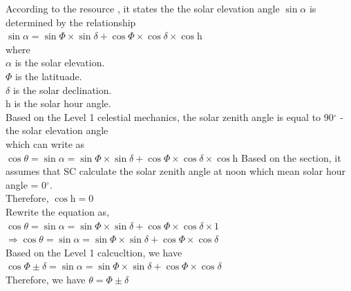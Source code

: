 \documentclass[12pt]{article}
\begin{document}
	According to the resource \cite{Harold1968}, it states the the solar elevation angle $\sin{\alpha}$ is
determined by the relationship\\
					$\sin{\alpha} = \sin{\Phi} \times \sin{\delta} + \cos{\Phi} \times \cos{\delta} \times \cos{\text{h}}$\\
		where \\
		  $\alpha$ is the solar elevation.\\
		  $\Phi$ is the latituade.\\
		  $\delta$ is the solar declination.\\
		  $\text{h}$ is the solar hour angle.\\
Based on the Level 1 celestial mechanics, the solar zenith angle 
is equal to 90$^\circ$ - the solar elevation angle\\
			which can write as\\
$\cos{\theta} = \sin{\alpha} = \sin{\Phi} \times \sin{\delta} + \cos{\Phi} \times \cos{\delta} \times \cos{\text{h}}$
			Based on the  section, it assumes that SC calculate the solar zenith 
angle at noon which mean solar hour angle = 0$^\circ$.\\
			Therefore, $\cos{\text{h}} = 0$\\
				Rewrite the equation as,\\
$\cos{\theta} = \sin{\alpha} = \sin{\Phi} \times \sin{\delta} + \cos{\Phi} \times \cos{\delta} \times 1$\\
$\Rightarrow  \cos{\theta} = \sin{\alpha} = \sin{\Phi} \times \sin{\delta} + \cos{\Phi} \times \cos{\delta}$\\
			Based on the Level 1 calcucltion, we have\\
$\cos{\Phi \pm \delta} = \sin{\alpha} = \sin{\Phi} \times \sin{\delta} + \cos{\Phi} \times \cos{\delta}$\\
			Therefore, we have
			$\theta = \Phi \pm \delta$\\




~\newline
\end{document}
